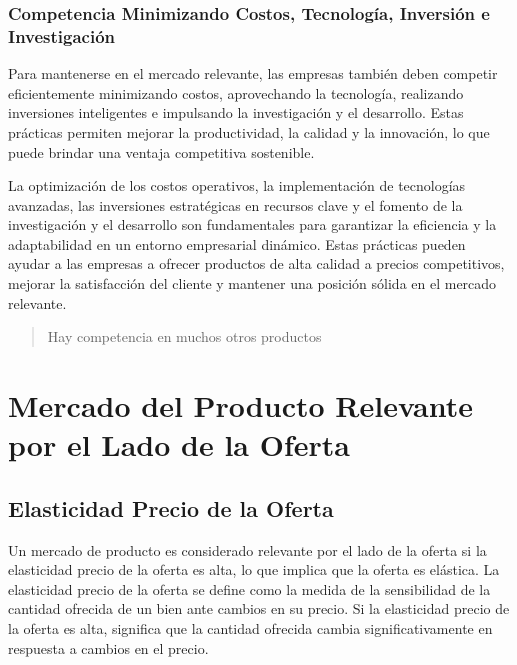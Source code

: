 \documentclass[
  letterpaper,
  DIV=11,
  numbers=noendperiod]{scrartcl}
\begin{document}
\hypertarget{competencia-minimizando-costos-tecnologuxeda-inversiuxf3n-e-investigaciuxf3n}{%
\subsubsection{Competencia Minimizando Costos, Tecnología, Inversión e
Investigación}\label{competencia-minimizando-costos-tecnologuxeda-inversiuxf3n-e-investigaciuxf3n}}

Para mantenerse en el mercado relevante, las empresas también deben
competir eficientemente minimizando costos, aprovechando la tecnología,
realizando inversiones inteligentes e impulsando la investigación y el
desarrollo. Estas prácticas permiten mejorar la productividad, la
calidad y la innovación, lo que puede brindar una ventaja competitiva
sostenible.

La optimización de los costos operativos, la implementación de
tecnologías avanzadas, las inversiones estratégicas en recursos clave y
el fomento de la investigación y el desarrollo son fundamentales para
garantizar la eficiencia y la adaptabilidad en un entorno empresarial
dinámico. Estas prácticas pueden ayudar a las empresas a ofrecer
productos de alta calidad a precios competitivos, mejorar la
satisfacción del cliente y mantener una posición sólida en el mercado
relevante.

\begin{quote}
Hay competencia en muchos otros productos
\end{quote}

\hypertarget{mercado-del-producto-relevante-por-el-lado-de-la-oferta}{%
\section{Mercado del Producto Relevante por el Lado de la
Oferta}\label{mercado-del-producto-relevante-por-el-lado-de-la-oferta}}

\hypertarget{elasticidad-precio-de-la-oferta}{%
\subsection{Elasticidad Precio de la
Oferta}\label{elasticidad-precio-de-la-oferta}}

Un mercado de producto es considerado relevante por el lado de la oferta
si la elasticidad precio de la oferta es alta, lo que implica que la
oferta es elástica. La elasticidad precio de la oferta se define como la
medida de la sensibilidad de la cantidad ofrecida de un bien ante
cambios en su precio. Si la elasticidad precio de la oferta es alta,
significa que la cantidad ofrecida cambia significativamente en
respuesta a cambios en el precio.
\end{document}

